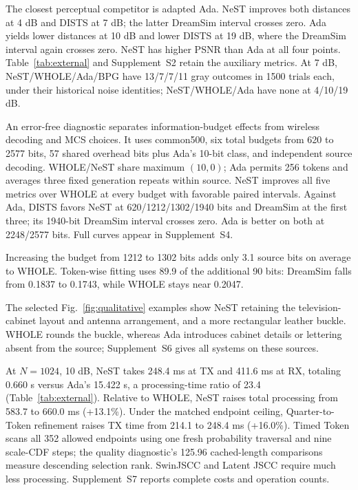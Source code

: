 The closest perceptual competitor is adapted Ada. NeST improves both distances at 4 dB and DISTS at 7 dB; the latter DreamSim interval crosses zero. Ada yields lower distances at 10 dB and lower DISTS at 19 dB, where the DreamSim interval again crosses zero. NeST has higher PSNR than Ada at all four points. Table~\ref{tab:external} and Supplement~S2 retain the auxiliary metrics. At 7 dB, NeST/WHOLE/Ada/BPG have 13/7/7/11 gray outcomes in 1500 trials each, under their historical noise identities; NeST/WHOLE/Ada have none at 4/10/19 dB.

An error-free diagnostic separates information-budget effects from wireless decoding and MCS choices. It uses common500, six total budgets from 620 to 2577 bits, 57 shared overhead bits plus Ada's 10-bit class, and independent source decoding. WHOLE/NeST share maximum $(10,0)$; Ada permits 256 tokens and averages three fixed generation repeats within source. NeST improves all five metrics over WHOLE at every budget with favorable paired intervals. Against Ada, DISTS favors NeST at 620/1212/1302/1940 bits and DreamSim at the first three; its 1940-bit DreamSim interval crosses zero. Ada is better on both at 2248/2577 bits. Full curves appear in Supplement~S4.

Increasing the budget from 1212 to 1302 bits adds only 3.1 source bits on average to WHOLE. Token-wise fitting uses 89.9 of the additional 90 bits: DreamSim falls from 0.1837 to 0.1743, while WHOLE stays near 0.2047.

The selected Fig.~\ref{fig:qualitative} examples show NeST retaining the television-cabinet layout and antenna arrangement, and a more rectangular leather buckle. WHOLE rounds the buckle, whereas Ada introduces cabinet details or lettering absent from the source; Supplement~S6 gives all systems on these sources.

At $N=1024$, 10 dB, NeST takes 248.4 ms at TX and 411.6 ms at RX, totaling 0.660 s versus Ada's 15.422 s, a processing-time ratio of 23.4 (Table~\ref{tab:external}). Relative to WHOLE, NeST raises total processing from 583.7 to 660.0 ms (+13.1\%). Under the matched endpoint ceiling, Quarter-to-Token refinement raises TX time from 214.1 to 248.4 ms (+16.0\%). Timed Token scans all 352 allowed endpoints using one fresh probability traversal and nine scale-CDF steps; the quality diagnostic's 125.96 cached-length comparisons measure descending selection rank. SwinJSCC and Latent JSCC require much less processing. Supplement~S7 reports complete costs and operation counts.

